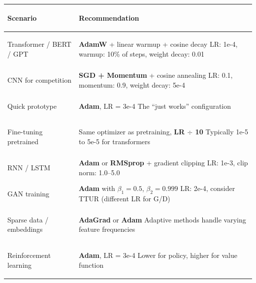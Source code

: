 \documentclass[../main.tex]{subfiles}
\begin{document}
\begin{tcolorbox}[colback=gray!5, colframe=black!70, boxrule=1pt, title={\textbf{Which Optimizer Should I Use?}}, fonttitle=\large\bfseries, coltitle=black, attach boxed title to top center={yshift=-2mm}]

\small
\renewcommand{\arraystretch}{1.4}
\begin{tabularx}{\textwidth}{@{}>{\bfseries\raggedright}p{3.8cm} >{\raggedright\arraybackslash}X@{}}
\toprule
\textbf{Scenario} & \textbf{Recommendation} \\
\midrule

Transformer / BERT / GPT &
\textbf{AdamW} + linear warmup + cosine decay \newline
{\footnotesize LR: 1e-4, warmup: 10\% of steps, weight decay: 0.01} \\[0.15cm]

CNN for competition &
\textbf{SGD + Momentum} + cosine annealing \newline
{\footnotesize LR: 0.1, momentum: 0.9, weight decay: 5e-4} \\[0.15cm]

Quick prototype &
\textbf{Adam}, LR = 3e-4 \newline
{\footnotesize The ``just works'' configuration} \\[0.15cm]

Fine-tuning pretrained &
Same optimizer as pretraining, \textbf{LR $\div$ 10} \newline
{\footnotesize Typically 1e-5 to 5e-5 for transformers} \\[0.15cm]

RNN / LSTM &
\textbf{Adam} or \textbf{RMSprop} + gradient clipping \newline
{\footnotesize LR: 1e-3, clip norm: 1.0--5.0} \\[0.15cm]

GAN training &
\textbf{Adam} with $\beta_1 = 0.5$, $\beta_2 = 0.999$ \newline
{\footnotesize LR: 2e-4, consider TTUR (different LR for G/D)} \\[0.15cm]

Sparse data / embeddings &
\textbf{AdaGrad} or \textbf{Adam} \newline
{\footnotesize Adaptive methods handle varying feature frequencies} \\[0.15cm]

Reinforcement learning &
\textbf{Adam}, LR = 3e-4 \newline
{\footnotesize Lower for policy, higher for value function} \\[0.15cm]


\end{tabularx}
\end{tcolorbox}
\end{document}
